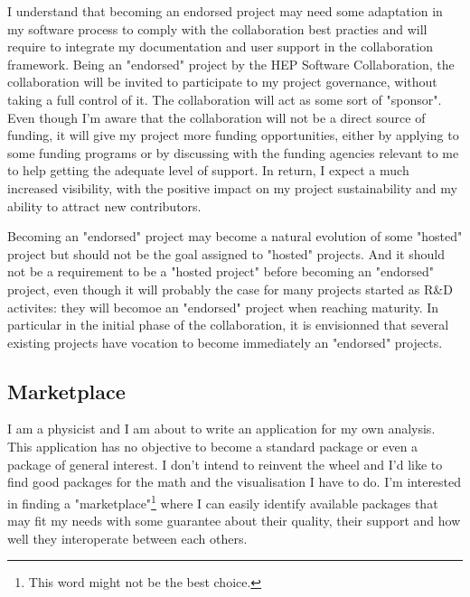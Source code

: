 \documentclass[11pt]{article} %
\begin{document}
I understand that becoming an endorsed project may need some adaptation in my software process to comply with the collaboration best practies and will require
to integrate my documentation and user support in the collaboration framework. Being an "endorsed" project by the HEP Software Collaboration, the collaboration
will be invited to participate to my project governance, without taking a full control of it. The collaboration will act as some sort of "sponsor". Even though I'm aware
that the collaboration will not be a direct source of funding, it will give my project more funding opportunities, either by applying to some funding programs or 
by discussing with the funding
agencies relevant to me to help getting the adequate level of support. In return, I expect a much increased visibility, with the positive impact
on my project sustainability and my ability to attract new contributors.

Becoming an "endorsed" project may become a natural evolution of some "hosted" project but should not be the goal assigned to "hosted" projects. And
it should not be a requirement to be a "hosted project" before becoming an "endorsed" project, even though it will probably the case for many projects
started as R\&D activites: they will becomoe an "endorsed" project when reaching maturity. In particular in the initial phase of the collaboration,
it is envisionned that several existing projects have vocation to become immediately an "endorsed" projects.

\subsection{Marketplace}

I am a physicist and I am about to write an application for my own analysis. This application has no objective to become a standard
package or even a package of general interest. I don't intend to reinvent the wheel and I'd like to find good
packages for the math and the visualisation I have to do. I'm interested in finding a "marketplace"\footnote{This word might not be the best choice.}
where I can easily identify available packages that may fit my needs with some guarantee about their quality,
their support and how well they interoperate between each others.
\end{document}
